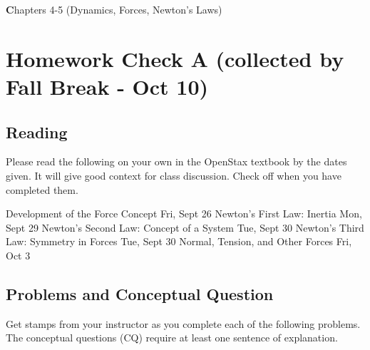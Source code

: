\documentclass[10pt]{exam}
\author{Rohrbach}
\date{\today}
\def\mytitle{Chapters 4-5 (Dynamics, Forces, Newton's Laws)}
\def\mymaketitle{
  \begin{flushleft}
    {\LARGE \textbf \mytitle \par}
  \end{flushleft}
}
\begin{document}
\mymaketitle



\newcommand{\stampbox}[1]{

  \hfill
  \begin{tikzpicture}[every text node part/.style={align=center}]
     \node[gray!50,draw,rounded corners] at (0,0) 
      {\sc Stamp \\ \sc Here \\ \small #1 \sc Points};
  \end{tikzpicture}
  \vspace{1em}
  
  \hrule

}

\section*{Homework Check A (collected by Fall Break - Oct 10)}



\subsection*{Reading}

Please read the following on your own in the OpenStax textbook by the dates given.  It will give good context for class discussion.  Check off when you have completed them.

\vspace{1em}

\begin{checkboxes}
   Development of the Force Concept \dotfill Fri, Sept 26
   Newton's First Law: Inertia \dotfill Mon, Sept 29
   Newton's Second Law: Concept of a System \dotfill Tue, Sept 30
   Newton's Third Law: Symmetry in Forces \dotfill Tue, Sept 30
   Normal, Tension, and Other Forces \dotfill Fri, Oct 3
\end{checkboxes}


\subsection*{Problems and Conceptual Question}


Get stamps from your instructor as you complete each of the following problems.  The conceptual questions (CQ) require at least one sentence of explanation.

\vspace{1em}
\end{document}
